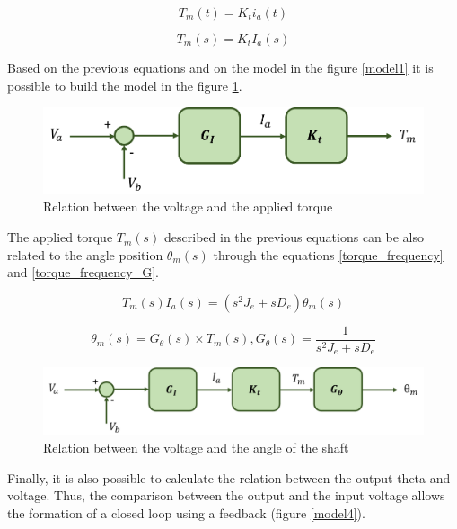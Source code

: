 \begin{equation}\label{torque_curr1}
T_{m}(t)= K_{t} i_{a}(t)
\end{equation}

\begin{equation}\label{torque_curr2}
T_{m}(s)= K_{t} I_{a}(s)
\end{equation}

Based on the previous equations and on the model in the figure \ref{model1} it is possible to build the model in the figure \ref{model2}.

\begin{figure}[H]
\centering
\includegraphics[scale=0.6]{figures/model2.png}
\caption{Relation between the voltage and the applied torque}
\label{model2}
\end{figure}

The applied torque $T_{m}(s)$ described in the previous equations can be also related to the angle position $\theta_{m}(s)$ through the equations \ref{torque_frequency} and \ref{torque_frequency_G}.

\begin{equation}\label{torque_frequency}
T_{m}(s) I_{a}(s)= (s^{2}J_{e} + sD_{e})\theta_{m}(s)
\end{equation}

\begin{equation}\label{torque_frequency_G}
\theta_{m}(s)= G_{\theta}(s)\times T_{m}(s) , G_{\theta}(s)=\frac{1}{s^{2}J_{e} + sD_{e}}
\end{equation}

\begin{figure}[H]
\centering
\includegraphics[scale=0.6]{figures/model3.png}
\caption{Relation between the voltage and the angle of the shaft}
\label{model3}
\end{figure}

Finally, it is also possible to calculate the relation between the output theta and voltage. Thus, the comparison between the output and the input voltage allows the formation of a closed loop using a feedback (figure \ref{model4}).

